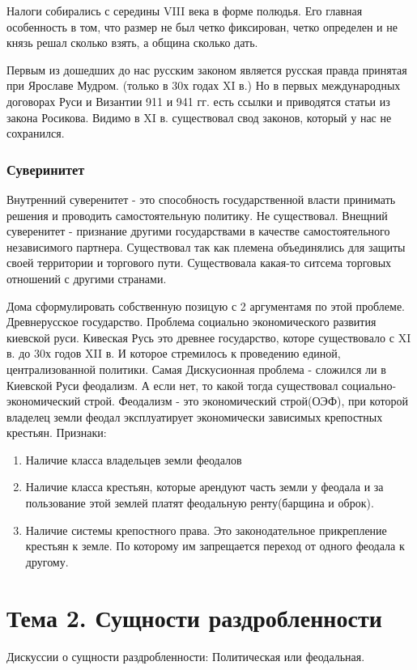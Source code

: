 \documentclass[a4paper]{article}
\begin{document}
Налоги собирались с середины VIII века в форме полюдья. Его главная особенность в том, что размер не был четко фиксирован, четко определен и не князь решал сколько взять, а община сколько дать.

Первым из дошедших до нас русским законом является русская правда принятая при Ярославе Мудром. (только в 30х годах XI в.) Но в первых международных договорах Руси и Византии 911 и 941 гг. есть ссылки и приводятся статьи из закона Росикова. Видимо в XI в. существовал свод законов, который у нас не сохранился.

\subsubsection{Суверинитет}
Внутренний суверенитет - это способность государственной власти принимать решения и проводить самостоятельную политику. Не существовал.
Внещний суверенитет - признание другими государствами в качестве самостоятельного независимого партнера.
Существовал так как племена объединялись для защиты своей территории и торгового пути. Существовала какая-то ситсема торговых отношений с другими странами.

Дома сформулировать собственную позицую с 2 аргументамя по этой проблеме.
Древнерусское государство. Проблема социально экономического развития киевской руси.
Кивеская Русь это древнее государство, которе существовало с XI в. до 30х годов XII в. И которое стремилось к проведению единой, централизованной политики. Самая Дискусионная проблема - сложился ли в Киевской Руси феодализм. А если нет, то какой тогда существовал социально-экономический строй.
Феодализм - это экономический строй(ОЭФ), при которой владелец земли феодал эксплуатирует экономически зависимых крепостных крестьян.
Признаки:
\begin{enumerate}
    \item Наличие класса владельцев земли феодалов
    \item Наличие класса крестьян, которые арендуют часть земли у феодала и за пользование этой землей платят феодальную ренту(барщина и оброк).
    \item Наличие системы крепостного права. Это законодательное прикрепление крестьян к земле. По которому им запрещается переход от одного феодала к другому.
\end{enumerate}

\section{Тема 2. Сущности раздробленности}
Дискуссии о сущности раздробленности:
Политическая или феодальная.
\end{document}
